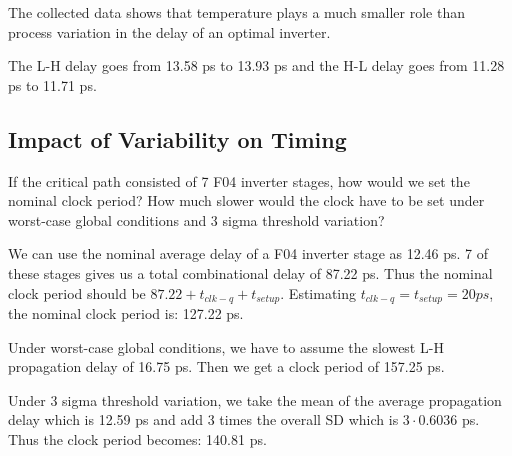 \documentclass[11pt]{article}
\begin{document}
The collected data shows that temperature plays a much smaller role than process variation in the delay of an optimal inverter.

The L-H delay goes from 13.58 ps to 13.93 ps and the H-L delay goes from 11.28 ps to 11.71 ps.

\subsection{Impact of Variability on Timing}
If the critical path consisted of 7 F04 inverter stages, how would we set the nominal clock period? How much slower would the clock have to be set under worst-case global conditions and 3 sigma threshold variation?

We can use the nominal average delay of a F04 inverter stage as 12.46 ps. 7 of these stages gives us a total combinational delay of 87.22 ps. Thus the nominal clock period should be $87.22 + t_{clk-q} + t_{setup}$. Estimating $t_{clk-q} = t_{setup} = 20 ps$, the nominal clock period is: 127.22 ps.

Under worst-case global conditions, we have to assume the slowest L-H propagation delay of 16.75 ps. Then we get a clock period of 157.25 ps.

Under 3 sigma threshold variation, we take the mean of the average propagation delay which is 12.59 ps and add 3 times the overall SD which is $3 \cdot 0.6036$ ps. Thus the clock period becomes: 140.81 ps.

\newpage
\appendix
\end{document}
